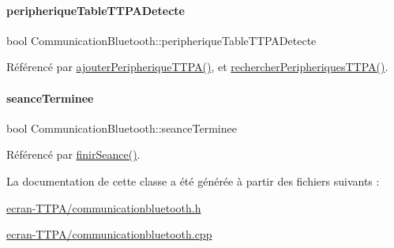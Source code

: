 \paragraph{\texorpdfstring{peripherique\+Table\+T\+T\+P\+A\+Detecte}{peripheriqueTableTTPADetecte}}
{\footnotesize\ttfamily bool Communication\+Bluetooth\+::peripherique\+Table\+T\+T\+P\+A\+Detecte}



Référencé par \hyperlink{class_communication_bluetooth_a53bc4772892ec57f030600e49fa0b6ff}{ajouter\+Peripherique\+T\+T\+P\+A()}, et \hyperlink{class_communication_bluetooth_a4c2e2d557728c227faeb247cb8a9c482}{rechercher\+Peripheriques\+T\+T\+P\+A()}.

\mbox{\label{class_communication_bluetooth_a80ddad176c95b72e083c32b39b4454cc}} 
\paragraph{\texorpdfstring{seance\+Terminee}{seanceTerminee}}
{\footnotesize\ttfamily bool Communication\+Bluetooth\+::seance\+Terminee}



Référencé par \hyperlink{class_communication_bluetooth_ab2170ef9c868ac2a26b76675c71f770e}{finir\+Seance()}.



La documentation de cette classe a été générée à partir des fichiers suivants \+:\begin{DoxyCompactItemize}
\item 
\hyperlink{ecran-_t_t_p_a_2communicationbluetooth_8h}{ecran-\/\+T\+T\+P\+A/communicationbluetooth.\+h}\item 
\hyperlink{ecran-_t_t_p_a_2communicationbluetooth_8cpp}{ecran-\/\+T\+T\+P\+A/communicationbluetooth.\+cpp}\end{DoxyCompactItemize}
